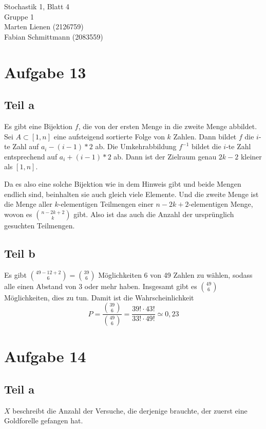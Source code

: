 \documentclass[10pt,a4paper]{article}
\begin{document}
Stochastik 1, Blatt 4\\
Gruppe 1\\
Marten Lienen (2126759)\\
Fabian Schmittmann (2083559)

\section{Aufgabe 13}

\subsection{Teil a}
Es gibt eine Bijektion $f$, die von der ersten Menge in die zweite Menge abbildet.
Sei $A \subset [1, n]$ eine aufsteigend sortierte Folge von $k$ Zahlen.
Dann bildet $f$ die $i$-te Zahl auf $a_{i} - (i - 1) * 2$ ab.
Die Umkehrabbildung $f^{-1}$ bildet die $i$-te Zahl entsprechend auf $a_{i} + (i - 1) * 2$ ab.
Dann ist der Zielraum genau $2k - 2$ kleiner als $[1, n]$.

Da es also eine solche Bijektion wie in dem Hinweis gibt und beide Mengen endlich sind, beinhalten sie auch gleich viele Elemente.
Und die zweite Menge ist die Menge aller $k$-elementigen Teilmengen einer $n - 2k + 2$-elementigen Menge, wovon es $\binom{n - 2k + 2}{k}$ gibt.
Also ist das auch die Anzahl der ursprünglich gesuchten Teilmengen.

\subsection{Teil b}
Es gibt $\binom{49 - 12 + 2}{6} = \binom{39}{6}$ Möglichkeiten 6 von 49 Zahlen zu wählen, sodass alle einen Abstand von $3$ oder mehr haben.
Insgesamt gibt es $\binom{49}{6}$ Möglichkeiten, dies zu tun.
Damit ist die Wahrscheinlichkeit
\begin{equation}
  P = \frac{\binom{39}{6}}{\binom{49}{6}} = \frac{39! \cdot 43!}{33! \cdot 49!} \simeq 0,23
\end{equation}

\section{Aufgabe 14}

\subsection{Teil a}
$X$ beschreibt die Anzahl der Versuche, die derjenige brauchte, der zuerst eine Goldforelle gefangen hat.
\end{document}
